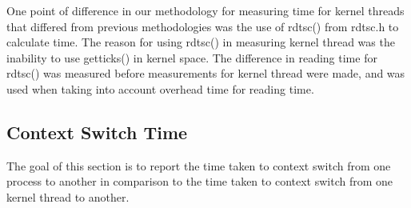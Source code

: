 \documentclass{article} %
\begin{document}
One point of difference in our methodology for measuring time for kernel threads that differed from previous methodologies was the use of rdtsc() from rdtsc.h to calculate time. The reason for using rdtsc() in measuring kernel thread was the inability to use getticks() in kernel space. The difference in reading time for rdtsc() was measured before measurements for kernel thread were made, and was used when taking into account overhead time for reading time. 

\subsection{Context Switch Time}
The goal of this section is to report the time taken to context switch from one process to another in comparison to the time taken to context switch from one kernel thread to another. 
\end{document}
